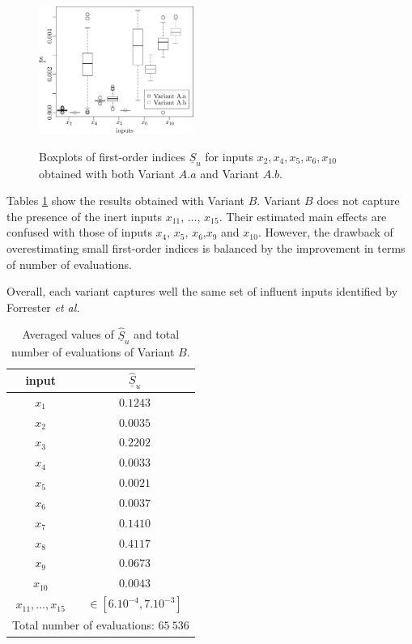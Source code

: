 {\begin{figure}[!ht]
\caption{Boxplots of first-order indices $\underline{S}_u$ for inputs $x_2,x_4,x_5,x_6,x_{10}$ obtained with both Variant $A.a$ and Variant $A.b$.}
\vspace*{0.2cm}
\centering
\includegraphics[width=0.45\textwidth]{wingweight_box.eps}
\label{boxplots.wing}
\end{figure}

Tables \ref{res.wing.B} show the results obtained with Variant $B$. Variant $B$ does not capture the presence of the inert inputs $x_{11}$, $\dots$, $x_{15}$. Their estimated main effects are confused with those of inputs $x_4$, $x_5$, $x_6$,$x_9$ and $x_{10}$.  However, the drawback of overestimating small first-order indices is balanced by the improvement in terms of number of evaluations. 

Overall, each variant captures well the same set of influent inputs identified by Forrester \textit{et al.}
\begin{table}[t]
\caption{Averaged values of $\widehat{\underline{S}}_u$ and total number of evaluations of Variant $B$.}
 \centering
\begin{tabular}{cc}
\hline
 input & $\widehat{\underline{S}}_u$ \\ \hline
 $x_1$ & $0.1243$ \\ \hline
 $x_2$ & $0.0035$ \\ \hline
 $x_3$ & $0.2202$ \\ \hline
 $x_4$ & $0.0033$ \\ \hline
 $x_5$ & $0.0021$ \\ \hline
 $x_6$ & $0.0037$ \\ \hline 
 $x_7$ & $0.1410$ \\ \hline
 $x_8$ & $0.4117$ \\ \hline
 $x_9$ & $0.0673$ \\ \hline
 $x_{10}$ & $0.0043$ \\ \hline
 $x_{11},\dots,x_{15}$ & $\in [6.10^{-4},7.10^{-3}]$ \\ \hline
 \hline
\multicolumn{2}{l}{Total number of evaluations: $65 \ 536$} \\ \hline 
\end{tabular}
\label{res.wing.B}
\end{table}

}
